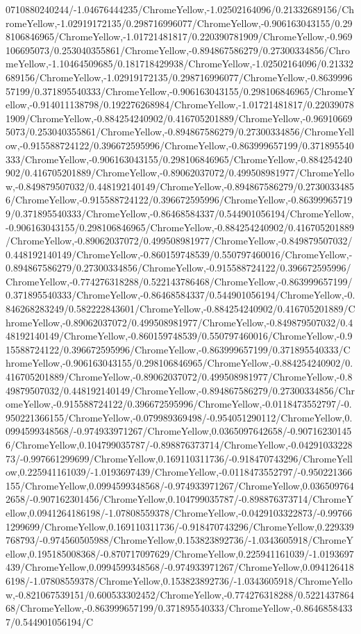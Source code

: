 {\begin{tikzternal}
{0710880240244/-1.04676444235/ChromeYellow,-1.02502164096/0.21332689156/ChromeYellow,-1.02919172135/0.298716996077/ChromeYellow,-0.906163043155/0.298106846965/ChromeYellow,-1.01721481817/0.220390781909/ChromeYellow,-0.969106695073/0.253040355861/ChromeYellow,-0.894867586279/0.27300334856/ChromeYellow,-1.10464509685/0.181718429938/ChromeYellow,-1.02502164096/0.21332689156/ChromeYellow,-1.02919172135/0.298716996077/ChromeYellow,-0.863999657199/0.371895540333/ChromeYellow,-0.906163043155/0.298106846965/ChromeYellow,-0.914011138798/0.192276268984/ChromeYellow,-1.01721481817/0.220390781909/ChromeYellow,-0.884254240902/0.416705201889/ChromeYellow,-0.969106695073/0.253040355861/ChromeYellow,-0.894867586279/0.27300334856/ChromeYellow,-0.915588724122/0.396672595996/ChromeYellow,-0.863999657199/0.371895540333/ChromeYellow,-0.906163043155/0.298106846965/ChromeYellow,-0.884254240902/0.416705201889/ChromeYellow,-0.89062037072/0.499508981977/ChromeYellow,-0.849879507032/0.448192140149/ChromeYellow,-0.894867586279/0.27300334856/ChromeYellow,-0.915588724122/0.396672595996/ChromeYellow,-0.863999657199/0.371895540333/ChromeYellow,-0.86468584337/0.544901056194/ChromeYellow,-0.906163043155/0.298106846965/ChromeYellow,-0.884254240902/0.416705201889/ChromeYellow,-0.89062037072/0.499508981977/ChromeYellow,-0.849879507032/0.448192140149/ChromeYellow,-0.860159748539/0.550797460016/ChromeYellow,-0.894867586279/0.27300334856/ChromeYellow,-0.915588724122/0.396672595996/ChromeYellow,-0.774276318288/0.522143786468/ChromeYellow,-0.863999657199/0.371895540333/ChromeYellow,-0.86468584337/0.544901056194/ChromeYellow,-0.846268283249/0.582222843601/ChromeYellow,-0.884254240902/0.416705201889/ChromeYellow,-0.89062037072/0.499508981977/ChromeYellow,-0.849879507032/0.448192140149/ChromeYellow,-0.860159748539/0.550797460016/ChromeYellow,-0.915588724122/0.396672595996/ChromeYellow,-0.863999657199/0.371895540333/ChromeYellow,-0.906163043155/0.298106846965/ChromeYellow,-0.884254240902/0.416705201889/ChromeYellow,-0.89062037072/0.499508981977/ChromeYellow,-0.849879507032/0.448192140149/ChromeYellow,-0.894867586279/0.27300334856/ChromeYellow,-0.915588724122/0.396672595996/ChromeYellow,-0.0118473552797/-0.950221366155/ChromeYellow,-0.079989369498/-0.954051290112/ChromeYellow,0.0994599348568/-0.974933971267/ChromeYellow,0.0365097642658/-0.907162301456/ChromeYellow,0.104799035787/-0.898876373714/ChromeYellow,-0.0429103322873/-0.997661299699/ChromeYellow,0.169110311736/-0.918470743296/ChromeYellow,0.225941161039/-1.0193697439/ChromeYellow,-0.0118473552797/-0.950221366155/ChromeYellow,0.0994599348568/-0.974933971267/ChromeYellow,0.0365097642658/-0.907162301456/ChromeYellow,0.104799035787/-0.898876373714/ChromeYellow,0.0941264186198/-1.07808559378/ChromeYellow,-0.0429103322873/-0.997661299699/ChromeYellow,0.169110311736/-0.918470743296/ChromeYellow,0.229339768793/-0.974560505988/ChromeYellow,0.153823892736/-1.0343605918/ChromeYellow,0.195185008368/-0.870717097629/ChromeYellow,0.225941161039/-1.0193697439/ChromeYellow,0.0994599348568/-0.974933971267/ChromeYellow,0.0941264186198/-1.07808559378/ChromeYellow,0.153823892736/-1.0343605918/ChromeYellow,-0.821067539151/0.600533302452/ChromeYellow,-0.774276318288/0.522143786468/ChromeYellow,-0.863999657199/0.371895540333/ChromeYellow,-0.86468584337/0.544901056194/C}
\end{tikzternal}}

